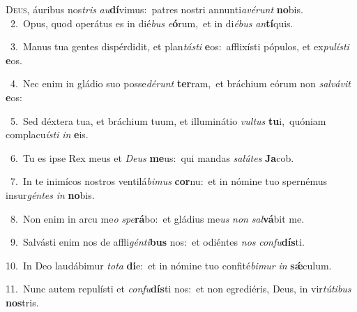 \lettrine{\initial\textcolor{\initialcolor}{D}}{eus,} áuribus nos\textit{tris} \textit{au}\-\textbf{dí}vimus:~\star patres nostri annunti\-\textit{a}\-\textit{vé}\textit{runt} \textbf{no}\-bis.\\
{\numbfont\textcolor{\numbcolor}{~2.}}~Opus, quod operátus es in dié\textit{bus} \textit{e}\-\textbf{ó}rum,~\star et in di\-\textit{é}\-\textit{bus} \textit{an}\-\textbf{tí}quis.\par
{\numbfont\textcolor{\numbcolor}{~3.}}~Manus tua gentes dispérdidit, et plan\-\textit{tás}\-\textit{ti} \textbf{e}\-os:~\star afflixísti pópulos, et ex\-\textit{pu}\-\textit{lís}\textit{ti} \textbf{e}\-os.\par
{\numbfont\textcolor{\numbcolor}{~4.}}~Nec enim in gládio suo posse\-\textit{dé}\-\textit{runt} \textbf{ter}\-ram,~\star et bráchium eórum non \textit{sal}\-\textit{vá}\textit{vit} \textbf{e}\-os:\par
{\numbfont\textcolor{\numbcolor}{~5.}}~Sed déxtera tua, et bráchium tuum, et illuminátio \textit{vul}\-\textit{tus} \textbf{tu}\-i,~\star quóniam complacu\-\textit{ís}\-\textit{ti} \textit{in} \textbf{e}\-is.\par
{\numbfont\textcolor{\numbcolor}{~6.}}~Tu es ipse Rex meus et \textit{De}\-\textit{us} \textbf{me}\-us:~\star qui mandas \textit{sa}\-\textit{lú}\textit{tes} \textbf{Ja}\-cob.\par
{\numbfont\textcolor{\numbcolor}{~7.}}~In te inimícos nostros ventilá\-\textit{bi}\-\textit{mus} \textbf{cor}\-nu:~\star et in nómine tuo spernémus insur\-\textit{gén}\-\textit{tes} \textit{in} \textbf{no}\-bis.\par
{\numbfont\textcolor{\numbcolor}{~8.}}~Non enim in arcu me\textit{o} \textit{spe}\-\textbf{rá}bo:~\star et gládius me\textit{us} \textit{non} \textit{sal}\-\textbf{vá}bit me.\par
{\numbfont\textcolor{\numbcolor}{~9.}}~Salvásti enim nos de affli\-\textit{gén}\-\textit{ti}\textbf{bus} nos:~\star et odiéntes \textit{nos} \textit{con}\-\textit{fu}\textbf{dís}ti.\par
{\numbfont\textcolor{\numbcolor}{10.}}~In Deo laudábimur \textit{to}\-\textit{ta} \textbf{di}\-e:~\star et in nómine tuo confité\-\textit{bi}\-\textit{mur} \textit{in} \textbf{sǽ}\-culum.\par
{\numbfont\textcolor{\numbcolor}{11.}}~Nunc autem repulísti et \textit{con}\-\textit{fu}\textbf{dís}ti nos:~\star et non egrediéris, Deus, in vir\-\textit{tú}\-\textit{ti}\textit{bus} \textbf{nos}\-tris.\par
